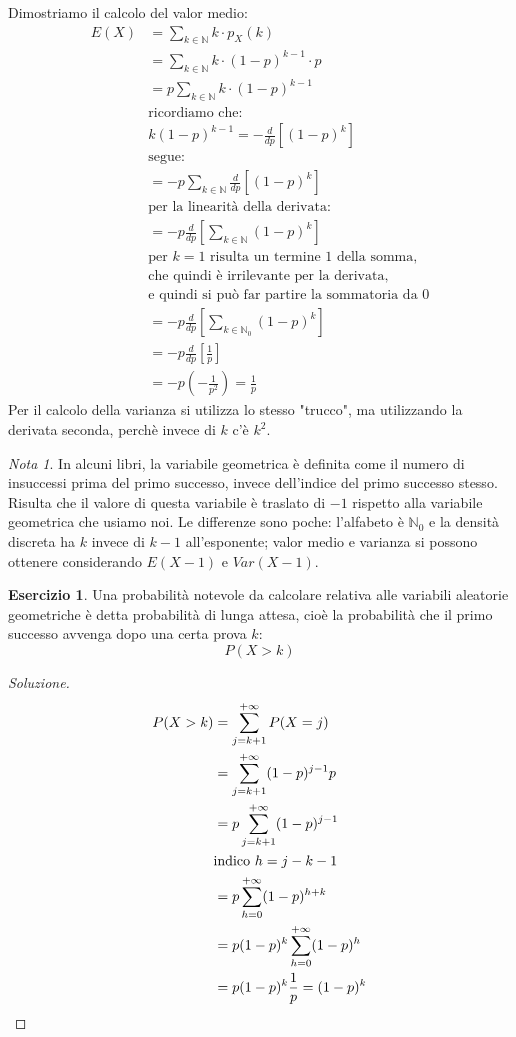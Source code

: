 \documentclass{article}
\theoremstyle{plain}
\theoremstyle{definition}
\newtheorem{esercizio}{Esercizio}[section]
\theoremstyle{remark}
\newtheorem*{nota}{Nota}
\newenvironment{soluzione}
	{\renewcommand\qedsymbol{$\mathwitch*$}\begin{proof}[Soluzione]}
	{\end{proof}}
\renewcommand{\qedsymbol}{$\mathrightghost$}
\begin{document}
Dimostriamo il calcolo del valor medio:
\begin{align*}
	E(X)&=\sum_{k\in\mathds{N}}k\cdot p_X(k)\\
	&=\sum_{k\in\mathds{N}}k\cdot(1-p)^{k-1}\cdot p\\
	&=p\sum_{k\in\mathds{N}}k\cdot(1-p)^{k-1}\\
	&\text{ricordiamo che:}\\
	&k(1-p)^{k-1}=-\frac{d}{dp}[(1-p)^k]\\
	&\text{segue:}\\
	&=-p\sum_{k\in\mathds{N}}\frac{d}{dp}[(1-p)^k]\\
	&\text{per la linearità della derivata:}\\
	&=-p\frac{d}{dp}\left[\sum_{k\in\mathds{N}}(1-p)^k\right]\\
	&\text{per $k=1$ risulta un termine $1$ della somma,}\\
	&\text{che quindi è irrilevante per la derivata,}\\
	&\text{e quindi si può far partire la sommatoria da $0$}\\
	&=-p\frac{d}{dp}\left[\sum_{k\in\mathds{N}_0}(1-p)^k\right]\\
	&=-p\frac{d}{dp}\left[\frac{1}{p}\right]\\
	&=-p\left(-\frac{1}{p^2}\right)=\frac{1}{p}
\end{align*}
Per il calcolo della varianza si utilizza lo stesso "trucco", ma utilizzando la derivata seconda, perchè invece di $k$ c'è $k^2$.
\begin{nota}
	In alcuni libri, la variabile geometrica è definita come il numero di insuccessi prima del primo successo, invece dell'indice del primo successo stesso. Risulta che il valore di questa variabile è traslato di $-1$ rispetto alla variabile geometrica che usiamo noi. Le differenze sono poche: l'alfabeto è $\mathds{N}_0$ e la densità discreta ha $k$ invece di $k-1$ all'esponente; valor medio e varianza si possono ottenere considerando $E(X-1)$ e $Var(X-1)$.
\end{nota}
\begin{esercizio}
	Una probabilità notevole da calcolare relativa alle variabili aleatorie geometriche è detta probabilità di lunga attesa, cioè la probabilità che il primo successo avvenga dopo una certa prova $k$:
	\begin{equation*}
		P(X>k)
	\end{equation*}
	\begin{soluzione}
		\begin{align*}
			P(X>k)&=\sum_{j=k+1}^{+\infty}P(X=j)\\
			&=\sum_{j=k+1}^{+\infty}(1-p)^{j-1}p\\
			&=p\sum_{j=k+1}^{+\infty}(1-p)^{j-1}\\
			&\text{indico }h=j-k-1\\
			&=p\sum_{h=0}^{+\infty}(1-p)^{h+k}\\
			&=p(1-p)^k\sum_{h=0}^{+\infty}(1-p)^h\\
			&=p(1-p)^k\frac{1}{p}=(1-p)^k\qedhere
		\end{align*}
	\end{soluzione}
\end{esercizio}
\end{document}
